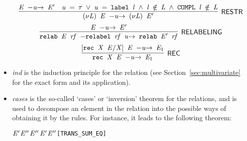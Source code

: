 \begin{itemize}
\begin{equation*}
\end{equation*}
\begin{equation*}
\infer[\HOLRuleName{RESTR}]{\HOLinline{\ensuremath{(\nu}\HOLFreeVar{L}\ensuremath{)} \HOLFreeVar{E} \HOLTokenTransBegin\HOLFreeVar{u}\HOLTokenTransEnd \ensuremath{(\nu}\HOLFreeVar{L}\ensuremath{)} \ensuremath{\HOLFreeVar{E}\sp{\prime}}}}{\HOLinline{\HOLFreeVar{E} \HOLTokenTransBegin\HOLFreeVar{u}\HOLTokenTransEnd \ensuremath{\HOLFreeVar{E}\sp{\prime}}}&\HOLinline{\HOLFreeVar{u} \HOLSymConst{\ensuremath{=}} \HOLSymConst{\ensuremath{\tau}} \HOLSymConst{\HOLTokenDisj{}} \HOLFreeVar{u} \HOLSymConst{\ensuremath{=}} \HOLConst{label} \HOLFreeVar{l} \HOLSymConst{\HOLTokenConj{}} \HOLFreeVar{l} \HOLSymConst{\HOLTokenNotIn{}} \HOLFreeVar{L} \HOLSymConst{\HOLTokenConj{}} \HOLConst{COMPL} \HOLFreeVar{l} \HOLSymConst{\HOLTokenNotIn{}} \HOLFreeVar{L}}}
\end{equation*}
\begin{equation*}
\infer[\HOLRuleName{RELABELING}]{\HOLinline{\HOLConst{relab} \HOLFreeVar{E} \HOLFreeVar{rf} \HOLTokenTransBegin\HOLConst{relabel} \HOLFreeVar{rf} \HOLFreeVar{u}\HOLTokenTransEnd \HOLConst{relab} \ensuremath{\HOLFreeVar{E}\sp{\prime}} \HOLFreeVar{rf}}}{\HOLinline{\HOLFreeVar{E} \HOLTokenTransBegin\HOLFreeVar{u}\HOLTokenTransEnd \ensuremath{\HOLFreeVar{E}\sp{\prime}}}}
\end{equation*}
\begin{equation*}
\infer[\HOLRuleName{REC}]{\HOLinline{\HOLConst{rec} \HOLFreeVar{X} \HOLFreeVar{E} \HOLTokenTransBegin\HOLFreeVar{u}\HOLTokenTransEnd \ensuremath{\HOLFreeVar{E}\sb{\mathrm{1}}}}}{\HOLinline{\ensuremath{[}\HOLConst{rec} \HOLFreeVar{X} \HOLFreeVar{E}\ensuremath{/}\HOLFreeVar{X}\ensuremath{]} \HOLFreeVar{E} \HOLTokenTransBegin\HOLFreeVar{u}\HOLTokenTransEnd \ensuremath{\HOLFreeVar{E}\sb{\mathrm{1}}}}}
\end{equation*}
\item \emph{ind} is the induction principle for the relation
  (see Section~\ref{sec:multivariate} for the exact form and its application).
\item \emph{cases} is the so-called `cases' or `inversion' theorem for
  the relations, and is used to decompose an element in the relation into the possible ways of
  obtaining it by the rules. For instance, it leads to the following
  theorem:
\begin{alltt}
\HOLTokenTurnstile{}  \HOLSymConst{\ensuremath{+}} \ensuremath{\HOLFreeVar{E}\sp{\prime}} \HOLTokenTransBegin{}\HOLTokenTransEnd \ensuremath{\HOLFreeVar{E}\sp{\prime\prime}} \HOLSymConst{\HOLTokenEquiv{}}  \HOLTokenTransBegin{}\HOLTokenTransEnd \ensuremath{\HOLFreeVar{E}\sp{\prime\prime}} \HOLSymConst{\HOLTokenDisj{}} \ensuremath{\HOLFreeVar{E}\sp{\prime}} \HOLTokenTransBegin{}\HOLTokenTransEnd \ensuremath{\HOLFreeVar{E}\sp{\prime\prime}}\hfill{[TRANS_SUM_EQ]}
\end{alltt}
\end{itemize}

